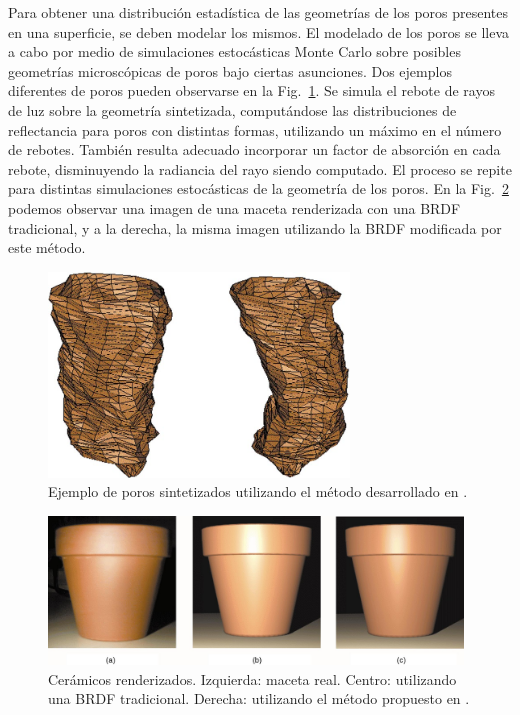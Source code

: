 Para obtener una distribución estadística de las geometrías de los poros presentes en una superficie, se deben modelar los mismos.
El modelado de los poros se lleva a cabo por medio de simulaciones estocásticas Monte Carlo sobre posibles geometrías microscópicas de poros bajo ciertas asunciones.
Dos ejemplos diferentes de poros pueden observarse en la Fig.~\ref{fg:poro}.
Se simula el rebote de rayos de luz sobre la geometría sintetizada, computándose las distribuciones de reflectancia para poros con distintas formas, utilizando un máximo en el número de rebotes.
También resulta adecuado incorporar un factor de absorción en cada rebote, disminuyendo la radiancia del rayo siendo computado.
El proceso se repite para distintas simulaciones estocásticas de la geometría de los poros.
En la Fig.~\ref{fg:ceramico} podemos observar una imagen de una maceta renderizada con una BRDF tradicional, y a la derecha, la misma imagen utilizando la BRDF modificada por este método.

\begin{figure}
\center
\includegraphics[width=8cm]{figures/poro}
\caption[Poros sinterizados]{Ejemplo de poros sintetizados utilizando el método desarrollado en \cite{Merillou2000}.}
\label{fg:poro}
\end{figure}

\begin{figure}
\center
\includegraphics[width=11cm]{figures/ceramico}
\caption[Cerámicos renderizados]{Cerámicos renderizados. Izquierda: maceta real. Centro: utilizando una BRDF tradicional. Derecha: utilizando el método propuesto en \cite{Merillou2000}.}
\label{fg:ceramico}
\end{figure}

